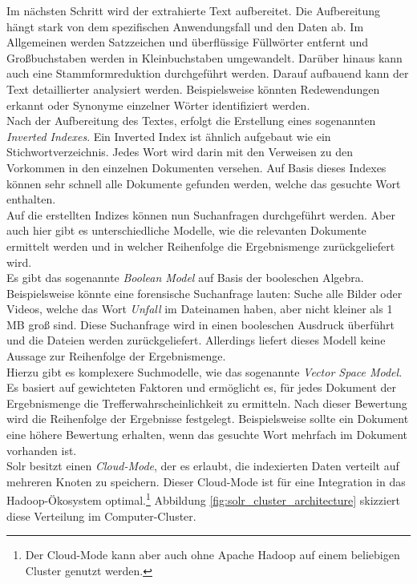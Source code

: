 \noindent
Im nächsten Schritt wird der extrahierte Text aufbereitet. Die Aufbereitung hängt stark von dem spezifischen Anwendungsfall und den Daten ab. Im Allgemeinen werden Satzzeichen und überflüssige Füllwörter entfernt und Großbuchstaben werden in Kleinbuchstaben umgewandelt. Darüber hinaus kann auch eine Stammformreduktion durchgeführt werden. Darauf aufbauend kann der Text detaillierter analysiert werden. Beispielsweise könnten Redewendungen erkannt oder Synonyme einzelner Wörter identifiziert werden.\cite[S.44]{solr_search}\\

\noindent
Nach der Aufbereitung des Textes, erfolgt die Erstellung eines sogenannten \textit{Inverted Indexes}. Ein Inverted Index ist ähnlich aufgebaut wie ein Stichwortverzeichnis. Jedes Wort wird darin mit den Verweisen zu den Vorkommen in den einzelnen Dokumenten versehen. Auf Basis dieses Indexes können sehr schnell alle Dokumente gefunden werden, welche das gesuchte Wort enthalten.\cite[S. 47]{solr_search}\\

\noindent
Auf die erstellten Indizes können nun Suchanfragen durchgeführt werden. Aber auch hier gibt es unterschiedliche Modelle, wie die relevanten Dokumente ermittelt werden und in welcher Reihenfolge die Ergebnismenge zurückgeliefert wird.\\
Es gibt das sogenannte \textit{Boolean Model} auf Basis der booleschen Algebra. Beispielsweise könnte eine forensische Suchanfrage lauten: Suche alle Bilder oder Videos, welche das Wort \textit{Unfall} im Dateinamen haben, aber nicht kleiner als 1 MB groß sind. Diese Suchanfrage wird in einen booleschen Ausdruck überführt und die Dateien werden zurückgeliefert. Allerdings liefert dieses Modell keine Aussage zur Reihenfolge der Ergebnismenge.\\
Hierzu gibt es komplexere Suchmodelle, wie das sogenannte \textit{Vector Space Model}. Es basiert auf gewichteten Faktoren und ermöglicht es, für jedes Dokument der Ergebnismenge die Trefferwahrscheinlichkeit zu ermitteln. Nach dieser Bewertung wird die Reihenfolge der Ergebnisse festgelegt. Beispielsweise sollte ein Dokument eine höhere Bewertung erhalten, wenn das gesuchte Wort mehrfach im Dokument vorhanden ist.\cite[S. 47 ff]{solr_search}\\

\noindent
Solr besitzt einen \textit{Cloud-Mode}, der es erlaubt, die indexierten Daten verteilt auf mehreren Knoten zu speichern. Dieser Cloud-Mode ist für eine Integration in das Hadoop-Ökosystem optimal.\footnote{Der Cloud-Mode kann aber auch ohne Apache Hadoop auf einem beliebigen Cluster genutzt werden.} Abbildung \ref{fig:solr_cluster_architecture} skizziert diese Verteilung im Computer-Cluster.\\

